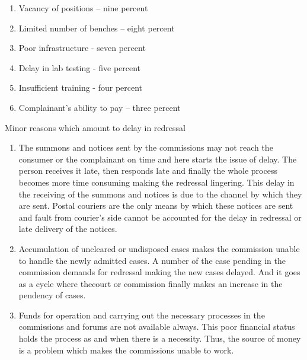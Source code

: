 \begin{multicols}{2}
\vspace{-.4cm}

\begin{enumerate}[label=$\bullet$]
\itemsep=0pt
\item Vacancy of positions – nine percent

\item Limited number of benches – eight percent

\item Poor infrastructure - seven percent

\item Delay in lab testing - five percent

\item Insufficient training - four percent

\item Complainant’s ability to pay – three percent
\end{enumerate}

\vspace{-.4cm}

\noi
Minor reasons which amount to delay in redressal

\vspace{-.4cm}

\begin{enumerate}[label=$\bullet$]
\itemsep=0pt
\item The summons and notices sent by the commissions may not reach the consumer or the
complainant on time and here starts the issue of delay. The person receives it late, then
responds late and finally the whole process becomes more time consuming making the
redressal lingering. This delay in the receiving of the summons and notices is due to the
channel by which they are sent. Postal couriers are the only means by which these
notices are sent and fault from courier’s side cannot be accounted for the delay in
redressal or late delivery of the notices.

\item Accumulation of uncleared or undisposed cases makes the commission unable to handle
the newly admitted cases. A number of the case pending in the commission demands
for redressal making the new cases delayed. And it goes as a cycle where thecourt or
commission finally makes an increase in the pendency of cases.

\item Funds for operation and carrying out the necessary processes in the commissions and
forums are not available always. This poor financial status holds the process as and
when there is a necessity. Thus, the source of money is a problem which makes the
commissions unable to work.


\end{enumerate}
\end{multicols}
